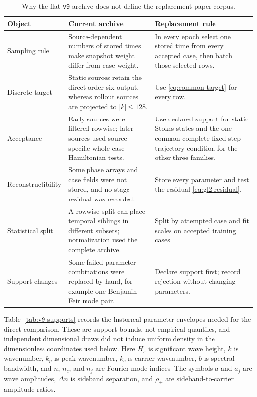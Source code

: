 \documentclass[11pt]{article}
\begin{document}
\begin{table}[ht]
  \centering
  \caption{Why the flat \texttt{v9} archive does not define the replacement
  paper corpus.}
  \label{tab:v9-defects}
  \small
  \begin{tabularx}{\textwidth}{
    @{}>{\raggedright\arraybackslash}p{}
       >{\raggedright\arraybackslash}X
       >{\raggedright\arraybackslash}p{}@{}}
    \toprule
    Object & Current archive & Replacement rule \\
    \midrule
    Sampling rule
      & Source-dependent numbers of stored times make snapshot weight differ
        from case weight.
      & In every epoch select one stored time from every accepted case, then
        batch those selected rows. \\
    Discrete target
      & Static sources retain the direct order-six output, whereas rollout
        sources are projected to $|k|\leq128$.
      & Use \eqref{eq:common-target} for every row. \\
    Acceptance
      & Early sources were filtered rowwise; later sources used
        source-specific whole-case Hamiltonian tests.
      & Use declared support for static Stokes states and the one common
        complete fixed-step trajectory condition for the other three
        families. \\
    Reconstructibility
      & Some phase arrays and case fields were not stored, and no stage
        residual was recorded.
      & Store every parameter and test the residual
        \eqref{eq:gl2-residual}. \\
    Statistical split
      & A rowwise split can place temporal siblings in different subsets;
        normalization used the complete archive.
      & Split by attempted case and fit scales on accepted training cases. \\
    Support changes
      & Some failed parameter combinations were replaced by hand, for example
        one Benjamin--Feir mode pair.
      & Declare support first; record rejection without changing parameters. \\
    \bottomrule
  \end{tabularx}
\end{table}

Table~\ref{tab:v9-supports} records the historical parameter envelopes needed
for the direct comparison.  These are support bounds, not empirical
quantiles, and independent dimensional draws did not induce uniform density
in the dimensionless coordinates used below.  Here $H_s$ is significant wave
height, $k$ is wavenumber, $k_p$ is peak wavenumber, $k_c$ is carrier
wavenumber, $b$ is spectral bandwidth, and $n$, $n_c$, and $n_j$ are Fourier
mode indices.  The symbols $a$ and $a_j$ are wave amplitudes, $\Delta n$ is
sideband separation, and $\rho_\pm$ are sideband-to-carrier amplitude ratios.
\end{document}
